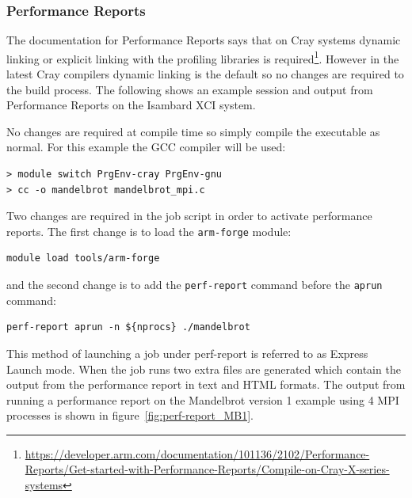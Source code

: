 \documentclass[a4paper,titlepage]{article}
\begin{document}

\subsubsection{Performance Reports}

The documentation for Performance Reports says that on Cray systems dynamic linking or explicit linking with the profiling libraries is required\footnote{\url{https://developer.arm.com/documentation/101136/2102/Performance-Reports/Get-started-with-Performance-Reports/Compile-on-Cray-X-series-systems}}. However in the latest Cray compilers dynamic linking is the default so no changes are required to the build process. The following shows an example session and output from Performance Reports on the Isambard XCI system.

No changes are required at compile time so simply compile the executable as normal. For this example the GCC compiler will be used:
\begin{verbatim}
> module switch PrgEnv-cray PrgEnv-gnu
> cc -o mandelbrot mandelbrot_mpi.c
\end{verbatim}
Two changes are required in the job script in order to activate performance reports. The first change is to load the \texttt{arm-forge} module:
\begin{verbatim}
module load tools/arm-forge
\end{verbatim}
and the second change is to add the \texttt{perf-report} command before the \texttt{aprun} command:
\begin{verbatim}
perf-report aprun -n ${nprocs} ./mandelbrot
\end{verbatim}
This method of launching a job under perf-report is referred to as Express Launch mode.
%
When the job runs two extra files are generated which contain the output from the performance report in text and HTML formats. The output from running a performance report on the Mandelbrot version 1 example using 4 MPI processes is shown in figure~\ref{fig:perf-report_MB1}.  
%
\end{document}
